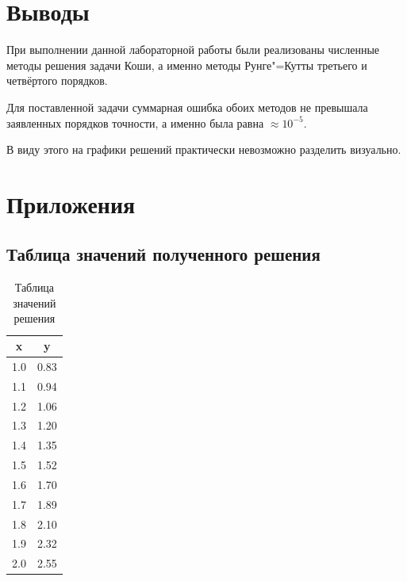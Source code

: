 \documentclass[a4paper,12pt,notitlepage,headsepline,pdftex]{scrartcl}
\begin{document}
\section{Выводы}
  При выполнении данной лабораторной работы были реализованы численные методы
  решения задачи Коши, а именно методы Рунге"=Кутты третьего и четвёртого
  порядков.

  Для поставленной задачи суммарная ошибка обоих методов не превышала
  заявленных порядков точности, а именно была равна $\approx 10^{-5}$.

  В виду этого на графики решений практически невозможно разделить визуально.
  \newpage
\section{Приложения}
  \subsection{Таблица значений полученного решения}
  \begin{table}[h!]
    \centering
    \begin{tabular}{|c|c|}
      \hline
      x & y\\
      \hline
      1.0 & 0.83\\
      1.1 & 0.94\\
      1.2 & 1.06\\
      1.3 & 1.20\\
      1.4 & 1.35\\
      1.5 & 1.52\\
      1.6 & 1.70\\
      1.7 & 1.89\\
      1.8 & 2.10\\
      1.9 & 2.32\\
      2.0 & 2.55\\
      \hline
    \end{tabular}
    \caption{Таблица значений решения}
    \label{tab:fxs}
  \end{table}
  \clearpage
\end{document}
